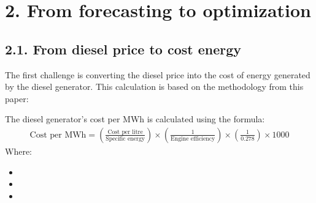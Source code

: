 \documentclass[letterpaper,10pt,english]{sphinxmanual}
\begin{document}
\section{2. From forecasting to optimization}
\label{\detokenize{index:from-forecasting-to-optimization}}

\subsection{2.1. From diesel price to cost energy}
\label{\detokenize{index:from-diesel-price-to-cost-energy}}
\sphinxAtStartPar
The first challenge is converting the diesel price into the cost of energy generated by the diesel generator.
This calculation is based on the methodology from this paper:

\sphinxAtStartPar
The diesel generator’s cost per MWh is calculated using the formula:
\begin{equation*}
\begin{split}\text{Cost per MWh} = \left( \frac{\text{Cost per litre}}{\text{Specific energy}} \right) \times \left( \frac{1}{\text{Engine efficiency}} \right) \times \left( \frac{1}{0.278} \right) \times 1000\end{split}
\end{equation*}
\sphinxAtStartPar
Where:
\begin{itemize}
\item {} 
\sphinxAtStartPar
{}

\item {} 
\sphinxAtStartPar
{}

\item {} 
\sphinxAtStartPar
{}

\end{itemize}
\end{document}
